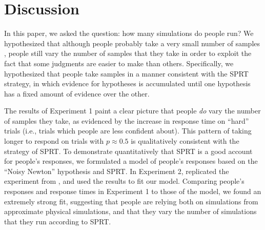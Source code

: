 \documentclass[10pt,letterpaper]{article}
\begin{document}
\section{Discussion}

In this paper, we asked the question: how many simulations do people run? We hypothesized that although people probably take a very small number of samples \cite{Vul:2014ba}, people still vary the number of samples that they take in order to exploit the fact that some judgments are easier to make than others. Specifically, we hypothesized that people take samples in a manner consistent with the SPRT strategy, in which evidence for hypotheses is accumulated until one hypothesis has a fixed amount of evidence over the other.

The results of Experiment 1 paint a clear picture that people \emph{do} vary the number of samples they take, as evidenced by the increase in response time on ``hard'' trials (i.e., trials which people are less confident about). This pattern of taking longer to respond on trials with $p\approx 0.5$ is qualitatively consistent with the strategy of SPRT. To demonstrate quantitatively that SPRT is a good account for people's responses, we formulated a model of people's responses based on the ``Noisy Newton'' hypothesis and SPRT. In Experiment 2, replicated the experiment from , and used the results to fit our model. Comparing people's responses and response times in Experiment 1 to those of the model, we found an extremely strong fit, suggesting that people are relying both on simulations from approximate physical simulations, and that they vary the number of simulations that they run according to SPRT.



\setlength{\bibleftmargin}{.125in}
\setlength{\bibindent}{-\bibleftmargin}


\end{document}
